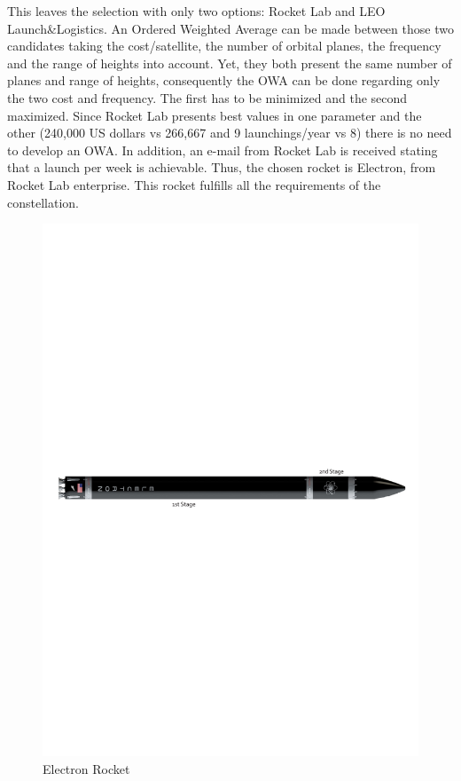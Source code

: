 \newline
This leaves the selection with only two options: Rocket Lab and LEO Launch\&Logistics. An Ordered Weighted Average can be made between those two candidates taking the cost/satellite, the number of orbital planes, the frequency and the range of heights into account. Yet, they both present the same number of planes and range of heights, consequently the OWA can be done regarding only the two cost and frequency. The first has to be minimized and the second maximized. Since Rocket Lab presents best values in one parameter and the other (240,000 US dollars vs 266,667 and 9 launchings/year vs 8) there is no need to develop an OWA. In addition, an e-mail from Rocket Lab is received stating that a launch per week is achievable. Thus, the chosen rocket is Electron, from Rocket Lab enterprise. This rocket fulfills all the requirements of the constellation. 
\newline
\begin{figure}[h!]
\centering 
\includegraphics[scale=0.7]{./Sections_CD/S2-Launcher/Images_S2/Picture_1_S2.pdf} 
\caption{Electron Rocket}
\label{fig:rocket}
\end{figure}
\newline
